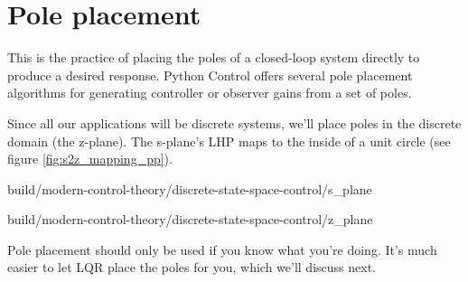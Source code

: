 \section{Pole placement}

This is the practice of placing the poles of a closed-loop \gls{system} directly
to produce a desired response. Python Control offers several pole placement
algorithms for generating controller or observer gains from a set of poles.

Since all our applications will be discrete \glspl{system}, we'll place poles in
the discrete domain (the z-plane). The s-plane's LHP maps to the inside of a
unit circle (see figure \ref{fig:s2z_mapping_pp}).
\begin{bookfigure}
  \begin{minisvg}{2}{build/modern-control-theory/discrete-state-space-control/s_plane}
  \end{minisvg}
  \hfill
  \begin{minisvg}{2}{build/modern-control-theory/discrete-state-space-control/z_plane}
  \end{minisvg}
  \caption{Mapping of axes from s-plane (left) to z-plane (right)}
  \label{fig:s2z_mapping_pp}
\end{bookfigure}

Pole placement should only be used if you know what you're doing. It's much
easier to let LQR place the poles for you, which we'll discuss next.
